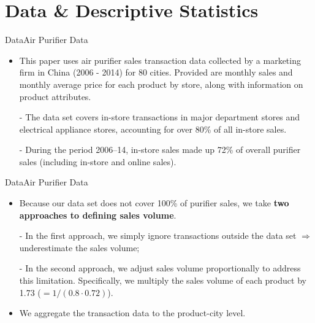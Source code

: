 \documentclass{beamer}
\begin{document}
\section{Data \& Descriptive Statistics}
\begin{frame}[shrink]
	\transfade %
	\tableofcontents[sectionstyle=show/shaded,subsectionstyle=show/shaded/hide]
	\addtocounter{framenumber}{-1}
\end{frame}
\begin{frame}{Data}{Air Purifier Data}
	\begin{itemize}
		\item This paper uses air purifier sales transaction data collected by a marketing firm in China (2006 - 2014) for 80 cities. Provided are monthly sales and monthly average price for each product by store, along with information on product attributes.
		\item [-] The data set covers in-store transactions in major department stores and electrical appliance stores, accounting for over 80\% of all in-store sales.
		\item [-] During the period 2006–14, in-store sales made up 72\% of overall purifier sales (including in-store and online sales).
	\end{itemize}
\end{frame}
\begin{frame}{Data}{Air Purifier Data}
	\begin{itemize}
		\item Because our data set does not cover 100\% of purifier sales, we take \textbf{two approaches to defining sales volume}.
		\item [-] In the first approach, we simply ignore transactions outside the data set $\Rightarrow$ underestimate the sales volume;
		\item [-] In the second approach, we adjust sales volume proportionally to address this limitation. Specifically, we multiply the sales volume of each product by 1.73 ($=1/(0.8\cdot0.72)$).
		\bigskip
		\item We aggregate the transaction data to the product-city level.
	\end{itemize}
\end{frame}
\end{document}
